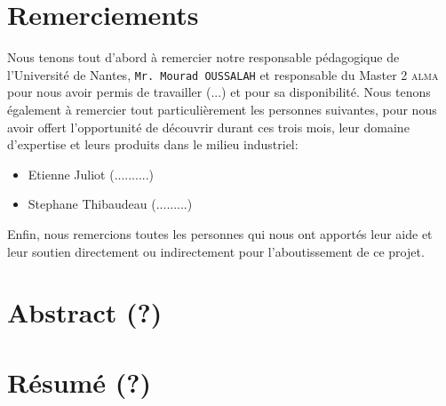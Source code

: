 \chapter*{Remerciements}
{}
Nous tenons tout d'abord à remercier notre responsable pédagogique de l'Université de Nantes,  \texttt{Mr. Mourad OUSSALAH} et responsable du Master 2 \textsc{alma} pour nous avoir permis de travailler (...) et pour sa disponibilité.
Nous tenons également à remercier tout particulièrement les personnes suivantes, pour nous avoir offert l'opportunité de découvrir durant ces trois mois, leur domaine d'expertise et leurs produits dans le milieu industriel:
\begin{itemize}
\item Etienne Juliot (..........)
\item Stephane Thibaudeau (.........)
\end{itemize}
Enfin, nous remercions toutes les personnes qui nous ont apportés leur aide et leur soutien directement ou indirectement pour l’aboutissement de ce projet.
\chapter*{Abstract (?)}

\chapter*{Résumé (?)}
